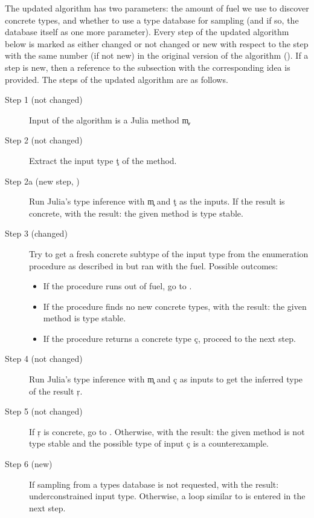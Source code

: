 The updated algorithm has two parameters:
the amount of fuel we use to discover concrete types,
and whether to use a type database for sampling (and if so, the database
itself as one more parameter).
Every step of the updated algorithm below is marked as either changed or not
changed or new with respect to the step with the same number (if not new) in the
original version of the algorithm ().
If a step is new, then a reference to the subsection with the corresponding idea is provided.
The steps of the updated algorithm are as follows.
\begin{description}
  \item[Step 1 (not changed)] Input of the algorithm is a Julia method \c{m}.
  \item[Step 2 (not changed)] Extract the input type \c{t} of the method.
  \item[Step 2a (new step, )]
    Run Julia's type inference with \c m and \c t as the
    inputs. If the result is concrete,  with the result: the given
    method is type stable.
  \item[Step 3 (changed)] Try to get a fresh concrete subtype of the input type
    from the enumeration procedure as described in 
    but ran with the fuel. Possible outcomes:
    \begin{itemize}
      \item If the procedure runs out of fuel, go to
        .
      \item If the procedure finds no new concrete types,  with the
      result: the given method is type stable.
      \item If the procedure returns a concrete type \c c, proceed to the next step.
    \end{itemize}
  \item[Step 4 (not changed)] Run Julia’s type inference with \c m and \c c as
    inputs to get the inferred type of the result \c r.
  \item[Step 5 (not changed)]
    If \c r  is concrete, go to . Otherwise, 
    with the result: the given method is not type stable and the possible type
    of input \c c is a counterexample.
  \item[Step 6 (new)]
    If sampling from a types database is not requested,  with
    the result: underconstrained input type.
    Otherwise,
    a loop similar to
     is entered in the next step.

\end{description}
